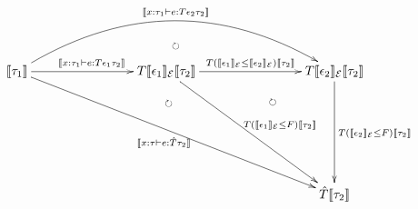 \documentclass[12pt]{article}
\newcommand{\semanticf}[1]{\llbracket #1\rrbracket}
\begin{document}
\pagestyle{empty}

\begin{align*}
  \vcenter{
    \xymatrix@=80pt{
      \semanticf{\tau_1}
      \ar@/^40pt/@{->}[rr]^{\semanticf{x: \tau_1 \vdash e: T \epsilon_2 \tau_2}}
      \ar@/^20pt/@{{}{ }{}}[rr]|{\circlearrowright}
      \ar@{->}[r]^{\semanticf{x: \tau_1 \vdash e: T \epsilon_1 \tau_2}}
      \ar@{->}[rrd]_{\semanticf{x: \tau \vdash e: \hat{T} \tau_2}}
      \ar@/^20pt/@{{}{ }{}}[rrd]|(0.45){\circlearrowright}
      &
      T \semanticf{\epsilon_1}_{\mathcal{E}} \semanticf{\tau_2}
      \ar@{->}[r]^{T (\semanticf{\epsilon_1}_{\mathcal{E}} \leq \semanticf{\epsilon_2}_{\mathcal{E}}) \semanticf{\tau_2}}
      \ar@{->}[rd]^{T (\semanticf{\epsilon_1}_{\mathcal{E}} \leq F) \semanticf{\tau_2}}
      \ar@/^30pt/@{{}{ }{}}[rd]|{\circlearrowright}
      &
      T \semanticf{\epsilon_2}_{\mathcal{E}} \semanticf{\tau_2}
      \ar@{->}[d]^{T (\semanticf{\epsilon_2}_{\mathcal{E}} \leq F) \semanticf{\tau_2}}
      \\
      &
      &
      \hat{T} \semanticf{\tau_2}
    }
  }
\end{align*}
\end{document}
